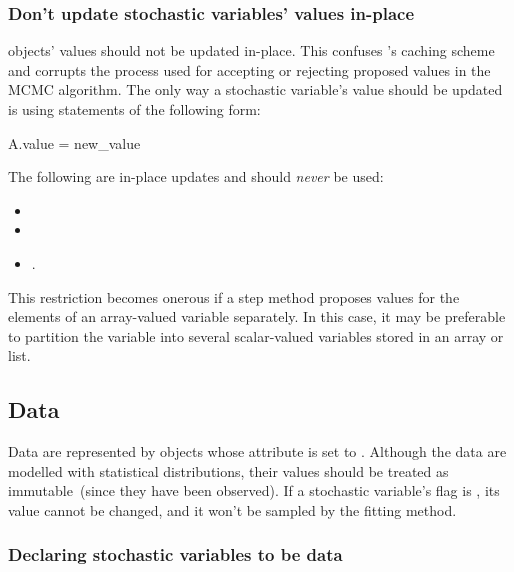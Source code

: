 \documentclass[]{jss}
\begin{document}
\begin{center}
\begin{boxedminipage}{.9\textwidth}
\subsubsection{Don't update stochastic variables' values in-place}


 objects' values should not be updated in-place. This confuses 's caching scheme and corrupts the process used for accepting or rejecting proposed values in the MCMC algorithm. The only way a stochastic variable's value should be updated is using statements of the following form:
\begin{CodeInput}
A.value = new_value
\end{CodeInput}
The following are in-place updates and should \emph{never} be used:
\begin{itemize}
    \item {}
    \item {}
    \item {}.
\end{itemize}

This restriction becomes onerous if a step method proposes values for the elements of an array-valued variable separately. In this case, it may be preferable to partition the variable into several scalar-valued variables stored in an array or list.
\end{boxedminipage}
\end{center}


\subsection{Data} \label{data}


Data are represented by  objects whose  attribute is set to . Although the data are modelled with statistical distributions, their values should be treated as immutable~(since they have been observed). If a stochastic variable's  flag is , its value cannot be changed, and it won't be sampled by the fitting method.

\subsubsection{Declaring stochastic variables to be data}
\end{document}
